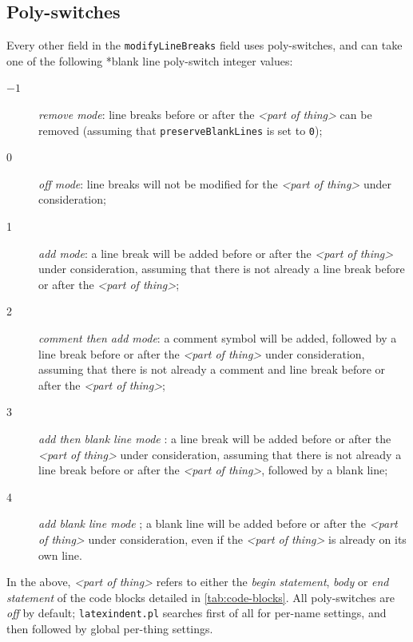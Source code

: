 
\subsection{Poly-switches}\label{sec:poly-switches}
 Every other field in the \texttt{modifyLineBreaks} field uses poly-switches, and can take
 one of the following%
 *{blank line poly-switch} integer values:
 \begin{description}
  \item[$-1$] \emph{remove mode}: line breaks before or after the
        \emph{<part of thing>} can be removed (assuming that \texttt{preserveBlankLines} is
        set to \texttt{0});
  \item[0] \emph{off mode}: line breaks will not be modified for the
        \emph{<part of thing>} under consideration;
  \item[1] \emph{add mode}: a line break will be added before or after the
        \emph{<part of thing>} under consideration, assuming that
        there is not already a line break before or after the \emph{<part of thing>};
  \item[2] \emph{comment then add mode}: a comment symbol will be added, followed by a line break
        before or after the \emph{<part of thing>} under consideration, assuming that there is
        not already a comment and line break before or after the \emph{<part of thing>};
  \item[3] \emph{add then blank line mode}%
        : a line break will be added before or after
        the \emph{<part of thing>} under consideration, assuming that there is not already a line
        break before or after the \emph{<part of thing>}, followed by a blank line;
  \item[4] \emph{add blank line mode}%
        ; a blank line will
        be added before or after the \emph{<part of thing>} under consideration, even if the
        \emph{<part of thing>} is already on its own line.
 \end{description}
 In the above, \emph{<part of thing>} refers to either the \emph{begin statement},
 \emph{body} or \emph{end statement} of the code blocks detailed in
 \vref{tab:code-blocks}. All poly-switches are \emph{off} by default;
 \texttt{latexindent.pl} searches first of all for per-name settings, and then followed
 by global per-thing settings.

